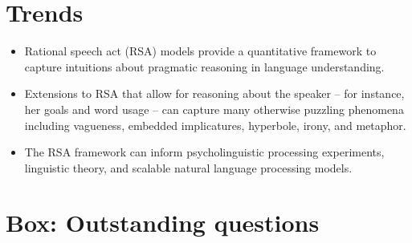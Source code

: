 \documentclass[]{elsarticle}
\begin{document}



\newpage

\appendix




\section{Trends}\label{trends-box}

\begin{itemize}
\item Rational speech act (RSA) models provide a quantitative framework to
  capture intuitions about pragmatic reasoning in language
  understanding.
\item Extensions to RSA that allow for reasoning about the speaker -- for instance, her goals and word usage -- can capture many otherwise puzzling phenomena
  including vagueness, embedded implicatures, hyperbole, irony, and
  metaphor.
\item The RSA framework can inform psycholinguistic processing experiments,
  linguistic theory, and scalable natural language processing models.
\end{itemize}

\section{Box: Outstanding questions}\label{box-outstanding-questions}
\end{document}
